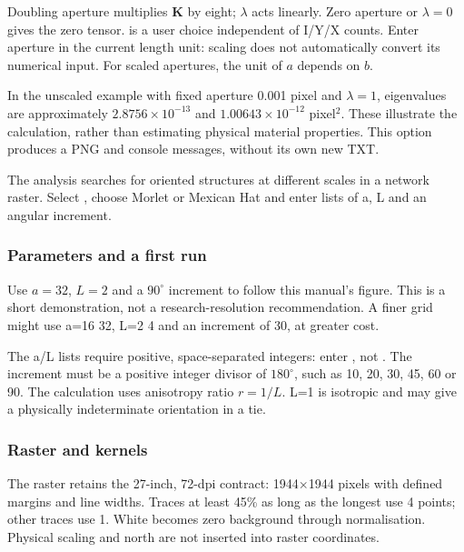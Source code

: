 Doubling aperture multiplies \(\mathbf K\) by eight; \(\lambda\) acts linearly. Zero aperture or \(\lambda=0\) gives the zero tensor.  is a user choice independent of I/Y/X counts. Enter aperture in the current length unit: scaling does not automatically convert its numerical input. For scaled apertures, the unit of \(a\) depends on \(b\).

In the unscaled example with fixed aperture 0.001 pixel and \(\lambda=1\), eigenvalues are approximately \(2.8756\times10^{-13}\) and \(1.00643\times10^{-12}\) pixel\(^{2}\). These illustrate the calculation, rather than estimating physical material properties. This option produces a PNG and console messages, without its own new TXT.

\label{sec:wavelets}
The analysis searches for oriented structures at different scales in a network raster. Select , choose Morlet or Mexican Hat and enter lists of a, L and an angular increment.

\subsubsection{Parameters and a first run}
Use \(a=32\), \(L=2\) and a \(90^\circ\) increment to follow this manual's figure. This is a short demonstration, not a research-resolution recommendation. A finer grid might use a=16 32, L=2 4 and an increment of 30, at greater cost.

The a/L lists require positive, space-separated integers: enter , not . The increment must be a positive integer divisor of \(180^\circ\), such as 10, 20, 30, 45, 60 or 90. The calculation uses anisotropy ratio \(r=1/L\). L=1 is isotropic and may give a physically indeterminate orientation in a tie.

\subsubsection{Raster and kernels}
The raster retains the 27-inch, 72-dpi contract: 1944\(\times\)1944 pixels with defined margins and line widths. Traces at least 45\% as long as the longest use 4 points; other traces use 1. White becomes zero background through normalisation. Physical scaling and north are not inserted into raster coordinates.

